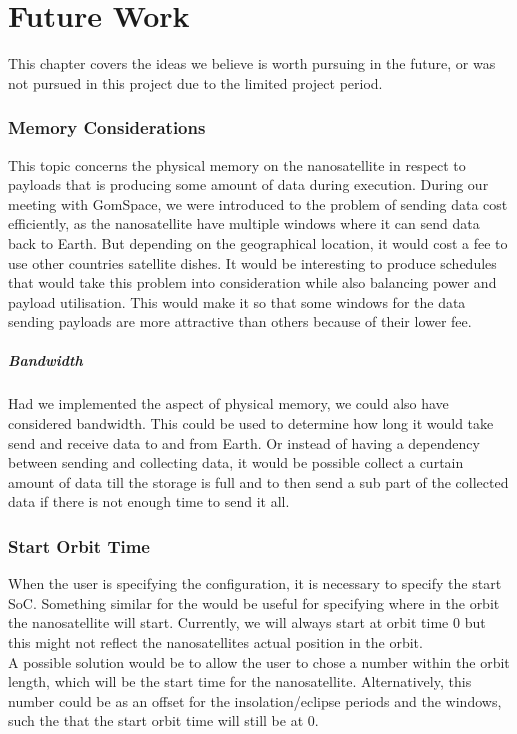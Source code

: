 \chapter{Future Work} \label{sec:future}
This chapter covers the ideas we believe is worth pursuing in the future, or was not pursued in this project due to the limited project period.

\subsection*{Memory Considerations}
This topic concerns the physical memory on the nanosatellite in respect to payloads that is producing some amount of data during execution. 
During our meeting with GomSpace, we were introduced to the problem of sending data cost efficiently, as the nanosatellite have multiple windows where it can send data back to Earth. 
But depending on the geographical location, it would cost a fee to use other countries satellite dishes.
It would be interesting to produce schedules that would take this problem into consideration while also balancing power and payload utilisation.
This would make it so that some windows for the data sending payloads are more attractive than others because of their lower fee.
\paragraph*{Bandwidth}
Had we implemented the aspect of physical memory, we could also have considered bandwidth. This could be used to determine how long it would take send and receive data to and from Earth. Or instead of having a dependency between sending and collecting data, it would be possible collect a curtain amount of data till the storage is full and to then send a sub part of the collected data if there is not enough time to send it all.

\subsection*{Start Orbit Time}
When the user is specifying the configuration, it is necessary to specify the start SoC. Something similar for the would be useful for specifying where in the orbit the nanosatellite will start. Currently, we will always start at orbit time 0 but this might not reflect the nanosatellites actual position in the orbit.\\
A possible solution would be to allow the user to chose a number within the orbit length, which will be the start time for the nanosatellite. Alternatively, this number could be as an offset for the insolation/eclipse periods and the windows, such the that the start orbit time will still be at 0.

